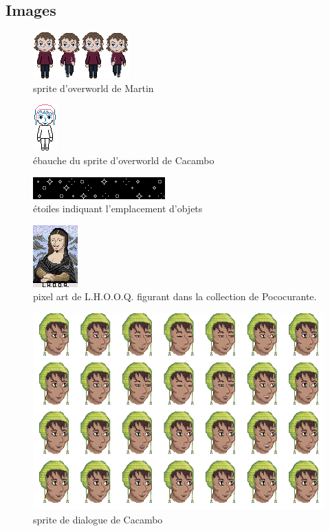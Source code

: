\documentclass[11pt]{article}
\begin{document}
\newpage
\begin{appendices}
\section{Images}
\begin{figure}[H]
\includegraphics{martinBase}
\centering
\caption{sprite d'overworld de Martin}
\end{figure}

\begin{figure}[H]
\includegraphics{cacamboSprite}
\centering
\caption{ébauche du sprite d'overworld de Cacambo}
\end{figure}

\begin{figure}[H]
\includegraphics{sparles}
\centering
\caption{étoiles indiquant l'emplacement d'objets}
\end{figure}

\begin{figure}[H]
\includegraphics{tableaux}
\centering
\caption{pixel art de L.H.O.O.Q. figurant dans la collection de Pococurante.}
\end{figure}

\begin{figure}[H]
\includegraphics[scale=0.4]{cacamboFaceAnimation}
\centering
\caption{sprite de dialogue de Cacambo}
\end{figure}


\end{appendices}
\end{document}
